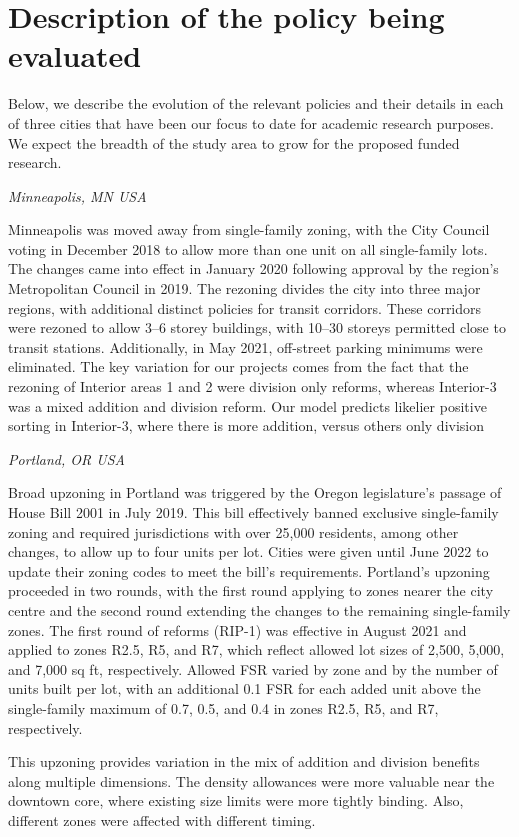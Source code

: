 \documentclass[12pt]{article}
\begin{document}
\section{Description of the policy being evaluated}

Below, we describe the evolution of the relevant policies and their details in
each of three cities that have been our focus to date for academic research
purposes. We expect the breadth of the study area to grow for the proposed
funded research.

\textit{Minneapolis, MN USA}

Minneapolis was moved away from single-family zoning, with the City Council
voting in December 2018 to allow more than one unit on all single-family lots.
The changes came into effect in January 2020 following approval by the region’s
Metropolitan Council in 2019. The rezoning divides the city into three major
regions, with additional distinct policies for transit corridors. These
corridors were rezoned to allow 3–6 storey buildings, with 10–30 storeys
permitted close to transit stations. Additionally, in May 2021, off-street
parking minimums were eliminated. The key variation for our projects comes from
the fact that the rezoning of Interior areas 1 and 2 were division only
reforms, whereas Interior-3 was a mixed addition and division reform. Our model
predicts likelier positive sorting in Interior-3, where there is more addition,
versus others only division

\textit{Portland, OR USA}

Broad upzoning in Portland was triggered by the Oregon legislature’s passage of
House Bill 2001 in July 2019. This bill effectively banned exclusive
single-family zoning and required jurisdictions with over 25,000 residents,
among other changes, to allow up to four units per lot. Cities were given until
June 2022 to update their zoning codes to meet the bill’s requirements.
Portland's upzoning proceeded in two rounds, with the first round applying to
zones nearer the city centre and the second round extending the changes to the
remaining single-family zones. The first round of reforms (RIP-1) was effective
in August 2021 and applied to zones R2.5, R5, and R7, which reflect allowed lot
sizes of 2,500, 5,000, and 7,000 sq ft, respectively. Allowed FSR varied by
zone and by the number of units built per lot, with an additional 0.1 FSR for
each added unit above the single-family maximum of 0.7, 0.5, and 0.4 in zones
R2.5, R5, and R7, respectively.

This upzoning provides variation in the mix of addition and division benefits
along multiple dimensions. The density allowances were more valuable near the
downtown core, where existing size limits were more tightly binding. Also,
different zones were affected with different timing.
\end{document}
